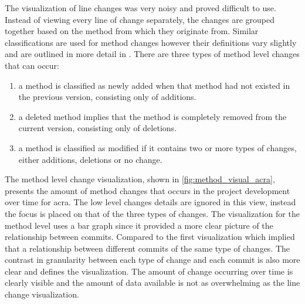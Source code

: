 The visualization of line changes was very noisy and proved difficult to use. Instead of viewing every line of change separately, the changes are grouped together based on the method from which they originate from. Similar classifications are used for method changes however their definitions vary slightly and are outlined in more detail in . There are three types of method level changes that can occur:
\begin{enumerate}
\item a method is classified as newly added when that method had not existed in the previous version, consisting only of additions.
\item a deleted method implies that the method is completely removed from the current version, consisting only of deletions.
\item a method is classified as modified if it contains two or more types of changes, either additions, deletions or no change.
\end{enumerate}
The method level change visualization, shown in \autoref{fig:method_visual_acra}, presents the amount of method changes that occurs in the project development over time for acra. The low level changes details are ignored in this view, instead the focus is placed on that of the three types of changes. The visualization for the method level uses a bar graph since it provided a more clear picture of the relationship between commits. Compared to the first visualization which implied that a relationship between different commits of the same type of changes. The contrast in granularity between each type of change and each commit is also more clear and defines the visualization. The amount of change occurring over time is clearly visible and the amount of data available is not as overwhelming as the line change visualization.


